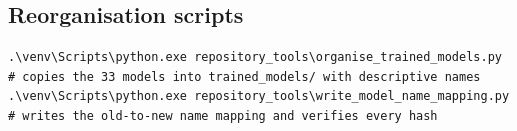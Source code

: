 \subsection{Reorganisation scripts}
\begin{lstlisting}
.\venv\Scripts\python.exe repository_tools\organise_trained_models.py        # copies the 33 models into trained_models/ with descriptive names
.\venv\Scripts\python.exe repository_tools\write_model_name_mapping.py       # writes the old-to-new name mapping and verifies every hash
\end{lstlisting}
